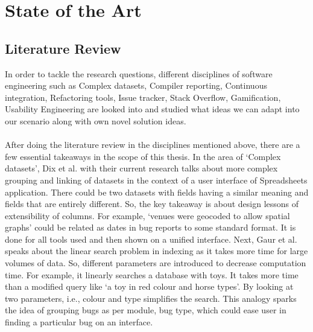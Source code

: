 \chapter{State of the Art}
\label{ch:stateoftheart_report}

\section{Literature Review}
\label{ch:literaturereview_report}

In order to tackle the research questions, different disciplines of software engineering such as Complex datasets, Compiler reporting, Continuous integration, Refactoring tools, Issue tracker, Stack Overflow, Gamification, Usability Engineering are looked into and studied what ideas we can adapt into our scenario along with own novel solution ideas. \\ \\

After doing the literature review in the disciplines mentioned above, there are a few essential takeaways in the scope of this thesis. In the area of ‘Complex datasets’, Dix et al. \cite{Dix} with their current research talks about more complex grouping and linking of datasets in the context of a user interface of Spreadsheets application. There could be two datasets with fields having a similar meaning and fields that are entirely different. So, the key takeaway is about design lessons of extensibility of columns. For example, ‘venues were geocoded to allow spatial graphs’ could be related as dates in bug reports to some standard format. It is done for all tools used and then shown on a unified interface. Next, Gaur et al. \cite{Gaur} speaks about the linear search problem in indexing as it takes more time for large volumes of data. So, different parameters are introduced to decrease computation time. For example, it linearly searches a database with toys.  It takes more time than a modified query like ‘a toy in red colour and horse types’.  By looking at two parameters, i.e., colour and type simplifies the search. This analogy sparks the idea of grouping bugs as per module, bug type, which could ease user in finding a particular bug on an interface. \\ \\

